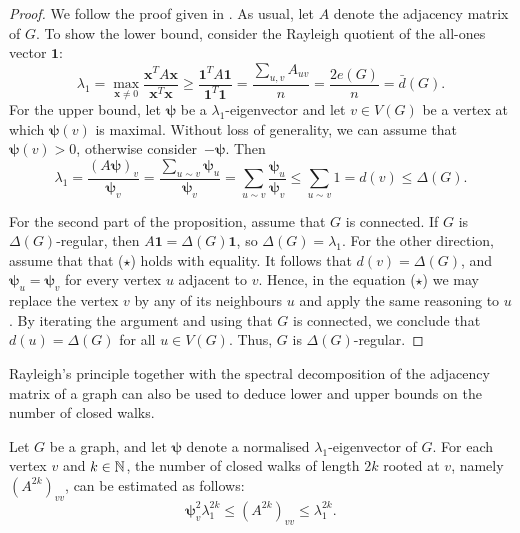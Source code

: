 \begin{proof}
    We follow the proof given in \cite{spielman}.
    As usual, let $A$ denote the adjacency matrix of $G$.
    To show the lower bound, consider the Rayleigh quotient of the all-ones vector $\bm{1}$:
    \begin{equation*}
        \lambda_1 = \max \limits_{\bm{x} \ne 0} \frac{\bm{x}^T A \bm{x}}{\bm{x}^T \bm{x}} 
            \ge \frac{\bm{1}^T A \bm{1}}{\bm{1}^T \bm{1}}
            = \frac{\sum_{u, v} A_{uv}}{n} 
            = \frac{2 e(G)}{n} = \bar{d} (G).
    \end{equation*}
    For the upper bound, let $\bm \psi$ be a $\lambda_1$-eigenvector and let $v \in V(G)$ be a vertex at which $\bm \psi (v)$ is maximal.
    Without loss of generality, we can assume that $\bm \psi (v) > 0$, otherwise \mbox{consider $-\bm{\psi}$}. 
    Then 
    \begin{equation*}
        \lambda_1 = \frac{(A \bm{\psi})_v}{\bm{\psi}_v} 
            = \frac{\sum_{u \sim v} \bm{\psi}_u}{\bm{\psi}_v} 
            = \sum \limits_{u \sim v} \frac{\bm{\psi}_u}{\bm{\psi}_v} 
            \le \sum \limits_{u \sim v} 1 = d(v) \le \Delta(G). 
            \tag{$\star$}
    \end{equation*}

    For the second part of the proposition, assume that $G$ is connected. 
    If $G$ is $\Delta(G)$-regular, then $A \bm{1} = \Delta(G) \bm{1}$, so $\Delta(G) = \lambda_1$.
    For the other direction, assume that that ($\star$) holds with equality.
    It follows that \mbox{$d(v) = \Delta(G)$}, and $\bm{\psi}_u = \bm{\psi}_v$ for every vertex $u$ adjacent to $v$.
    Hence, in the equation ($\star$) we may replace the vertex $v$ by any of its neighbours $u$ and apply the same reasoning to $u$.
    By iterating the argument and using that $G$ is connected, we conclude that $d(u) = \Delta(G)$ for all $u \in V(G)$.
    Thus, $G$ is $\Delta(G)$-regular.
\end{proof}

Rayleigh's principle together with the spectral decomposition of the adjacency matrix of a graph can also be used to deduce lower and upper bounds on the number of closed walks.
\begin{lemma} \label{lem:bounding-walks}
    Let $G$ be a graph, and let $\bm{\psi}$ denote a normalised $\lambda_1$-eigenvector of $G$.
    For each vertex $v$ and $k \in \mathbb{N}$, the number of closed walks of length $2k$ rooted at $v$, namely $(A^{2k})_{vv}$, can be estimated as follows:
    \begin{equation*}
        \bm{\psi}_v^2 \lambda_1 ^{2k} \le (A^{2k})_{vv} \le \lambda_1 ^{2k}.
    \end{equation*}
\end{lemma}

